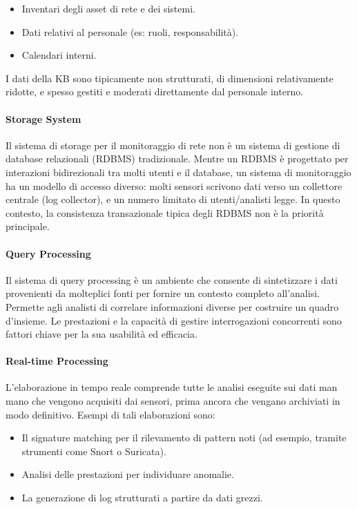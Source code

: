\begin{itemize}
\item Inventari degli asset di rete e dei sistemi.
\item Dati relativi al personale (es: ruoli, responsabilità).
\item Calendari interni.
\end{itemize}

I dati della KB sono tipicamente non strutturati, di dimensioni relativamente ridotte,
e spesso gestiti e moderati direttamente dal personale interno.

\paragraph
{Storage System}

Il sistema di storage per il monitoraggio di rete non è un sistema di gestione
di database relazionali (RDBMS) tradizionale.
Mentre un RDBMS è progettato per interazioni bidirezionali tra molti utenti
e il database, un sistema di monitoraggio ha un modello di accesso diverso:
molti sensori scrivono dati verso un collettore centrale (log collector),
e un numero limitato di utenti/analisti legge.
In questo contesto, la consistenza transazionale tipica degli RDBMS
non è la priorità principale.

\paragraph{Query Processing}

Il sistema di query processing è un ambiente che consente di sintetizzare
i dati provenienti da molteplici fonti
per fornire un contesto completo all'analisi.
Permette agli analisti di correlare informazioni diverse per costruire
un quadro d'insieme.
Le prestazioni e la capacità di gestire interrogazioni concorrenti
sono fattori chiave per la sua usabilità ed efficacia.

\paragraph{Real-time Processing}

L'elaborazione in tempo reale comprende tutte le analisi eseguite sui dati
man mano che vengono acquisiti dai sensori, prima ancora che vengano
archiviati in modo definitivo. Esempi di tali elaborazioni sono:

\begin{itemize}
\item Il signature matching per il rilevamento di pattern noti
(ad esempio, tramite strumenti come Snort o Suricata).
\item Analisi delle prestazioni per individuare anomalie.
\item La generazione di log strutturati a partire da dati grezzi.
\end{itemize}

